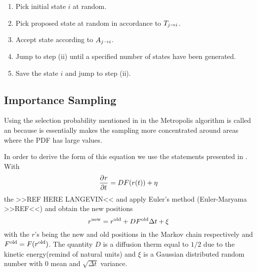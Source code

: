             \begin{enumerate}[label=(\roman*)]
                \item Pick initial state $i$ at random.
                \item Pick proposed state at random in accordance to
                    $T_{j\rightarrow i}$.
                \item Accept state according to $A_{j\rightarrow i}$.
                \item Jump to step (ii) until a specified number of states have
                    been generated.
                \item Save the state $i$ and jump to step (ii).
            \end{enumerate}

    \subsection{Importance Sampling\label{susec:impSamp}}
        Using the selection probability mentioned in  in the
        Metropolis algorithm is called an  because
        is essentially makes the sampling more concentrated around areas where
        the PDF has large values.

        In order to derive the form of this equation we use the statements
        presented in . With
            \begin{equation}
                \langevin
                \label{eq:langevin}
            \end{equation}
        the  >>REF HERE LANGEVIN<< and apply Euler's
        method (Euler-Maryama >>REF<<) and obtain the new positions
            \begin{equation}
                r^{\text{new}} = r^{\text{old}} + DF^{\text{old}}\Delta t + \xi
                \label{eq:rnewdef}
            \end{equation}
        with the $r$'s being the new and old positions in the Markov chain
        respectively and $F^{\text{old}}=F(r^{\text{old}})$. The quantity $D$ is a diffusion
        therm equal to $1/2$ due to the kinetic energy(remind of natural units)
        and $\xi$ is a Gaussian distributed random number with $0$ mean and
        $\sqrt{\Delta t}$ variance.

